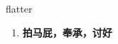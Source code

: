 
\begin{frame}
{\huge flatter}
\begin{center}
\begin{enumerate}\Large
  \item \textbf{拍马屁，奉承，讨好}
\end{enumerate}
\end{center}
\end{frame}
